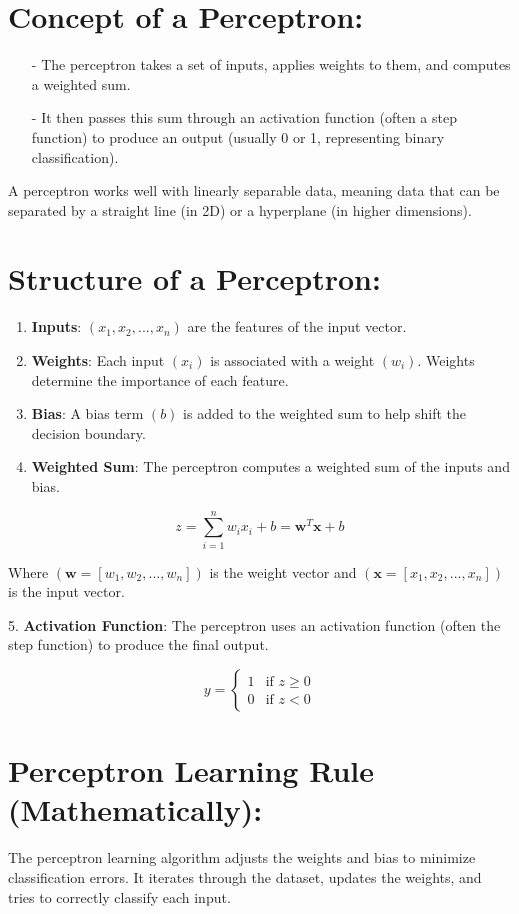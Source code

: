 \documentclass[10pt]{article}
\begin{document}
\section{ Concept of a Perceptron:}
\begin{itemize}
   \item [-] The perceptron takes a set of inputs, applies weights to them, and computes a weighted sum.
   \item [-] It then passes this sum through an activation function (often a step function) to produce an output (usually 0 or 1, representing binary classification).
\end{itemize}

A perceptron works well with linearly separable data, meaning data that can be separated by a straight line (in 2D) or a hyperplane (in higher dimensions).

\section{ Structure of a Perceptron:}

\begin{enumerate}
   \item {\bf Inputs}: $( x_1, x_2, ..., x_n )$ are the features of the input vector.
   \item {\bf Weights}: Each input $( x_i )$ is associated with a weight $( w_i )$. Weights determine the importance of each feature.
   \item {\bf Bias}: A bias term $( b )$ is added to the weighted sum to help shift the decision boundary.
   \item {\bf Weighted Sum}: The perceptron computes a weighted sum of the inputs and bias.
\end{enumerate}
   
$$
z = \sum_{i=1}^{n} w_i x_i + b = \mathbf{w}^T \mathbf{x} + b
$$

Where $( \mathbf{w} = [w_1, w_2, ..., w_n] )$ is the weight vector and $( \mathbf{x} = [x_1, x_2, ..., x_n] )$ is the input vector.

5. {\bf Activation Function}: The perceptron uses an activation function (often the step function) to produce the final output.

$$
y = \begin{cases} 
1 & \text{if } z \geq 0 \\ 
0 & \text{if } z < 0 
\end{cases}
$$

\section{ Perceptron Learning Rule (Mathematically):}
The perceptron learning algorithm adjusts the weights and bias to minimize classification errors. It iterates through the dataset, updates the weights, and tries to correctly classify each input.
\end{document}
